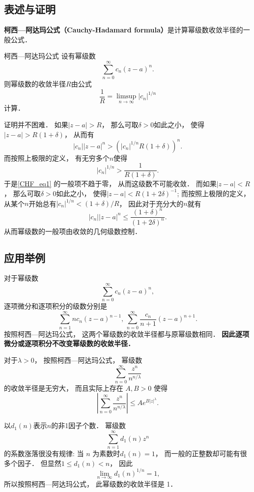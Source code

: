 

\subsection{表述与证明}

\textbf{柯西—阿达玛公式（Cauchy-Hadamard formula）}是计算幂级数收敛半径的一般公式．

\begin{theorem}{柯西—阿达玛公式}
设有幂级数
\begin{equation}\label{CHF_eq1}
\sum_{n=0}^\infty c_n(z-a)^n.
\end{equation}
则幂级数的收敛半径$R$由公式
$$
\frac{1}{R}=\limsup_{n\to\infty}|c_n|^{1/n}
$$
计算．
\end{theorem}
证明并不困难． 如果$|z-a|>R$， 那么可取$\delta>0$如此之小， 使得$|z-a|>R(1+\delta)$， 从而有
$$
|c_n||z-a|^n>(|c_n|^{1/n}R(1+\delta))^n.
$$
而按照上极限的定义， 有无穷多个$n$使得
$$
|c_n|^{1/n}>\frac{1}{R(1+\delta)}.
$$
于是\autoref{CHF_eq1} 的一般项不趋于零， 从而这级数不可能收敛． 而如果$|z-a|<R$， 那么可取$\delta>0$如此之小， 使得$|z-a|<R(1+2\delta)^{-1}$; 而按照上极限的定义， 从某个$n$开始总有$|c_n|^{1/n}<(1+\delta)/R$， 因此对于充分大的$n$就有
$$
|c_n||z-a|^n\leq\frac{(1+\delta)^n}{(1+2\delta)^n}.
$$
从而幂级数的一般项由收敛的几何级数控制．

\subsection{应用举例}
对于幂级数
$$
\sum_{n=0}^\infty c_n(z-a)^n,
$$
逐项微分和逐项积分的级数分别是
$$
\sum_{n=1}^\infty nc_n(z-a)^{n-1},\,
\sum_{n=0}^\infty \frac{c_n}{n+1}(z-a)^{n+1}.
$$
按照柯西—阿达玛公式， 这两个幂级数的收敛半径都与原幂级数相同． \textbf{因此逐项微分或逐项积分不改变幂级数的收敛半径．}

对于$\lambda>0$， 按照柯西—阿达玛公式， 幂级数
$$
\sum_{n=0}^\infty\frac{z^n}{n^{n/\lambda}}
$$
的收敛半径是无穷大， 而且实际上存在 $A,B>0$ 使得
$$
\left|\sum_{n=0}^\infty\frac{z^n}{n^{n/\lambda}}\right|
\leq Ae^{B|z|^\lambda}.
$$

以$d_1(n)$表示$n$的非1因子个数． 幂级数
$$
\sum_{n=1}^\infty d_1(n)z^n
$$
的系数涨落很没有规律: 当 $n$ 为素数时$d_1(n)=1$， 而一般的正整数却可能有很多个因子． 但显然$1\leq d_1(n)<n$， 因此
$$
\lim_{n\to\infty}d_1(n)^{1/n}=1,
$$
所以按照柯西—阿达玛公式， 此幂级数的收敛半径是 1．